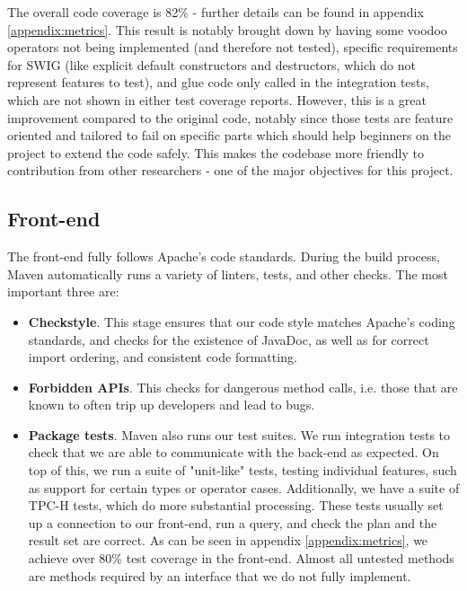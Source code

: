 The overall code coverage is 82\% - further details can be found in appendix \ref{appendix:metrics}. This result is notably brought down by having some voodoo operators not being implemented (and therefore not tested), specific requirements for SWIG (like explicit default constructors and destructors, which do not represent features to test), and glue code only called in the integration tests, which are not shown in either test coverage reports. However, this is a great improvement compared to the original code, notably since those tests are feature oriented and tailored to fail on specific parts which should help beginners on the project to extend the code safely. This makes the codebase more friendly to contribution from other researchers - one of the major objectives for this project.

\subsection{Front-end}

The front-end fully follows Apache's code standards. During the build process, Maven automatically runs a variety of linters, tests, and other checks. The most important three are:

\begin{itemize}
    \item \textbf{Checkstyle}. This stage ensures that our code style matches Apache's coding standards, and checks for the existence of JavaDoc, as well as for correct import ordering, and consistent code formatting.
    \item \textbf{Forbidden APIs}. This checks for dangerous method calls, i.e. those that are known to often trip up developers and lead to bugs.
    \item \textbf{Package tests}. Maven also runs our test suites. We run integration tests to check that we are able to communicate with the back-end as expected. On top of this, we run a suite of "unit-like" tests, testing individual features, such as support for certain types or operator cases. Additionally, we have a suite of TPC-H tests, which do more substantial processing. These tests usually set up a connection to our front-end, run a query, and check the plan and the result set are correct. As can be seen in appendix \ref{appendix:metrics}, we achieve over 80\% test coverage in the front-end. Almost all untested methods are methods required by an interface that we do not fully implement.
\end{itemize}